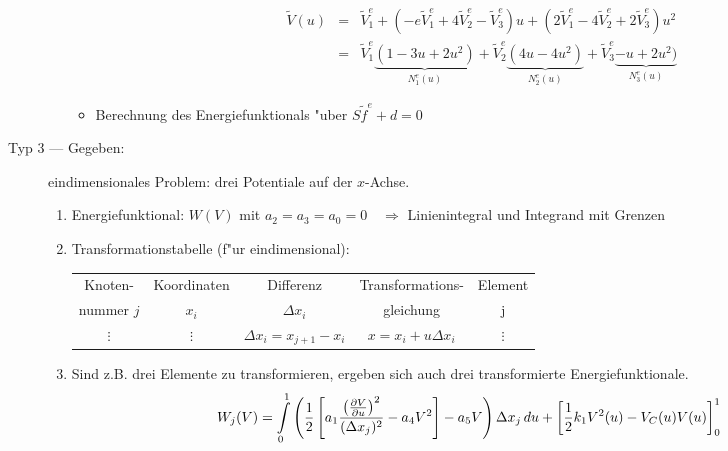 \begin{description}
\begin{enumerate}
\begin{itemize}
           \begin{eqnarray*}
           \tilde{V}(u)&=& \tilde{V}_1^e + (-e\tilde{V}_1^e + 4\tilde{V}_2^e -
           \tilde{V}_3^e) u + (2\tilde{V}_1^e - 4\tilde{V}_2^e + 2\tilde{V}_3^e)
           u^2\\ &=& \tilde{V}_1^e \underbrace{(1-3u+2u^2)}_{N_1^e(u)} +
           \tilde{V}_2^e \underbrace{(4u-4u^2)}_{N_2^e(u)} + \tilde{V}_3^e
           \underbrace{-u+2u^2)}_{N_3^e(u)}
           \end{eqnarray*}
      \item Berechnung des Energiefunktionals "uber $S\tilde{f}^e+d=0$
      \end{itemize}
   \end{enumerate}

\item[Typ 3 --- Gegeben:] eindimensionales Problem: drei Potentiale auf der
     $x$-Achse.
   \begin{enumerate}
   \item Energiefunktional: $W(V)$ mit $a_2=a_3=a_0=0 \quad \Rightarrow$
         Linienintegral und Integrand mit Grenzen
   \item Transformationstabelle (f"ur eindimensional):
     \begin{center}
     \begin{tabular}{|c|c|c|c|c|}
      Knoten-   & Koordinaten & Differenz   & Transformations- & Element \\
      nummer $j$&   $x_i$     & $\Delta x_i$&  gleichung       &   j   \\ \hline
      $\vdots$&$\vdots$ & $\Delta x_i=x_{j+1}-x_i$ & $x=x_i+u\Delta x_i$ & $\vdots$\\
     \end{tabular}
     \end{center}
   \item Sind z.B. drei Elemente zu transformieren, ergeben sich auch drei
     transformierte Energiefunktionale.
      $$W_j(V)=\int\limits_0^1 \left(\frac{1}{2} \left[ a_1
      \frac{\left(\frac{\partial V}{\partial u}\right)^2}{(\Delta x_j)^2} - a_4
      V^2 \right] -a_5 V \right) \Delta x_j \, du + \left[ \frac{1}{2} k_1
      V^2(u) -V_C(u)V(u)\right]_0^1$$
   \end{enumerate}


\end{description}

